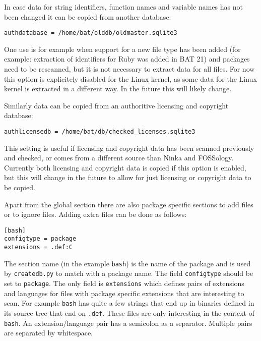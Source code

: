\documentclass[10pt,a4paper]{article}
\begin{document}
In case data for string identifiers, function names and variable names has not
been changed it can be copied from another database:

\begin{verbatim}
authdatabase = /home/bat/olddb/oldmaster.sqlite3
\end{verbatim}

One use is for example when support for a new file type has been added (for
example: extraction of identifiers for Ruby was added in BAT 21) and packages
need to be rescanned, but it is not necessary to extract data for all files.
For now this option is explicitely disabled for the Linux kernel, as some data
for the Linux kernel is extracted in a different way. In the future this will
likely change.

Similarly data can be copied from an authoritive licensing and copyright
database:

\begin{verbatim}
authlicensedb = /home/bat/db/checked_licenses.sqlite3
\end{verbatim}

This setting is useful if licensing and copyright data has been scanned
previously and checked, or comes from a different source than Ninka and
FOSSology. Currently both licensing and copyright data is copied if this option
is enabled, but this will change in the future to allow for just licensing or
copyright data to be copied.

Apart from the global section there are also package specific sections to add
files or to ignore files. Adding extra files can be done as follows:

\begin{verbatim}
[bash]
configtype = package
extensions = .def:C
\end{verbatim}

The section name (in the example \texttt{bash}) is the name of the package and
is used by \texttt{createdb.py} to match with a package name. The field
\texttt{configtype} should be set to \texttt{package}. The only field is
\texttt{extensions} which defines pairs of extensions and languages for files
with package specific extensions that are interesting to scan. For example
\texttt{bash} has quite a few strings that end up in binaries defined in its
source tree that end on \texttt{.def}. These files are only interesting in the
context of \texttt{bash}. An extension/language pair has a semicolon as a
separator. Multiple pairs are separated by whitespace.
\end{document}
